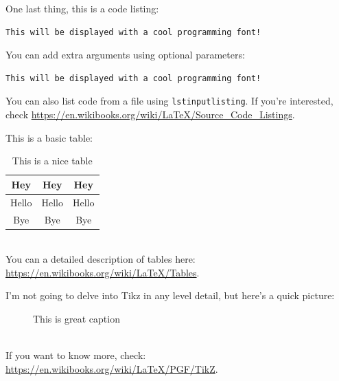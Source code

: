\documentclass[reprint,english,notitlepage]{revtex4-1}  %
\begin{document}
One last thing, this is a code listing:
\begin{lstlisting}
This will be displayed with a cool programming font!
\end{lstlisting}
You can add extra arguments using optional parameters:
\begin{lstlisting}[morekeywords={cool}]
This will be displayed with a cool programming font!
\end{lstlisting}
You can also list code from a file using \texttt{lstinputlisting}. If you're interested, check \url{https://en.wikibooks.org/wiki/LaTeX/Source_Code_Listings}.

This is a basic table:
\begin{table}[h]  %
\caption{This is a nice table}\label{table}
\begin{tabular}{|c|c|c|} %
\hline                    %
Hey & Hey & Hey  \\
\hline
Hello & Hello & Hello \\
\hline
Bye & Bye & Bye \\
\hline
\end{tabular}
\end{table}\\
You can a detailed description of tables here: \url{https://en.wikibooks.org/wiki/LaTeX/Tables}.

I'm not going to delve into Tikz in any level detail, but here's a quick picture:
\begin{figure}[h]
\centering  %
\caption{This is great caption}\label{figure}
\end{figure}\\
If you want to know more, check: \url{https://en.wikibooks.org/wiki/LaTeX/PGF/TikZ}.

\end{document}
